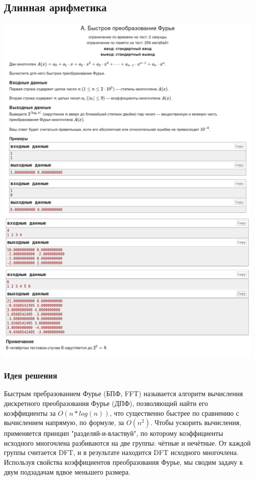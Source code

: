 \pagebreak

\subsection*{Длинная арифметика}
\begin{center}
\includegraphics[width=\textwidth]{statements/20220706/A1.png}
\includegraphics[width=\textwidth]{statements/20220706/A2.png}
\end{center}
\subsubsection*{Идея решения}

Быстрым пребразованием Фурье (БПФ, FFT) называется алгоритм вычисления дискретного преобразования Фурье (ДПФ), позволяющий найти его коэффициенты за $O(n*log(n))$, что существенно быстрее по сравнению с вычислением напрямую, по формуле, за $O(n^2)$. Чтобы ускорить вычисления, применяется принцип "разделяй-и-властвуй"{}, по которому коэффициенты исходного многочлена разбиваются на две группы: чётные и нечётные. От каждой группы считается DFT, и в результате находится DFT исходного многочлена. Используя свойства коэффициентов преобразования Фурье, мы сводим задачу к двум подзадачам вдвое меньшего размера.


